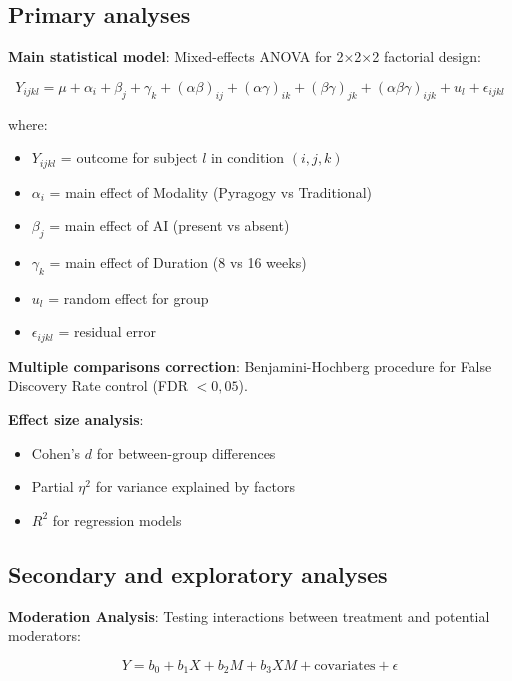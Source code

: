 \subsection{Primary analyses}

\textbf{Main statistical model}: Mixed-effects ANOVA for 2×2×2 factorial design:

\begin{equation}
Y_{ijkl} = \mu + \alpha_i + \beta_j + \gamma_k + (\alpha\beta)_{ij} + (\alpha\gamma)_{ik} + (\beta\gamma)_{jk} + (\alpha\beta\gamma)_{ijk} + u_l + \epsilon_{ijkl}
\label{eq:anova-model}
\end{equation}

where:
\begin{itemize}
    \item $Y_{ijkl}$ = outcome for subject $l$ in condition $(i,j,k)$
    \item $\alpha_i$ = main effect of Modality (Pyragogy vs Traditional)
    \item $\beta_j$ = main effect of AI (present vs absent)
    \item $\gamma_k$ = main effect of Duration (8 vs 16 weeks)
    \item $u_l$ = random effect for group
    \item $\epsilon_{ijkl}$ = residual error
\end{itemize}

\textbf{Multiple comparisons correction}: Benjamini-Hochberg procedure for False Discovery Rate control (FDR $< 0{,}05$).

\textbf{Effect size analysis}:
\begin{itemize}
    \item Cohen's $d$ for between-group differences
    \item Partial $\eta^2$ for variance explained by factors
    \item $R^2$ for regression models
\end{itemize}

\subsection{Secondary and exploratory analyses}

\textbf{Moderation Analysis}: Testing interactions between treatment and potential moderators:

\begin{equation}
Y = b_0 + b_1 X + b_2 M + b_3 XM + \text{covariates} + \epsilon
\label{eq:moderation}
\end{equation}

